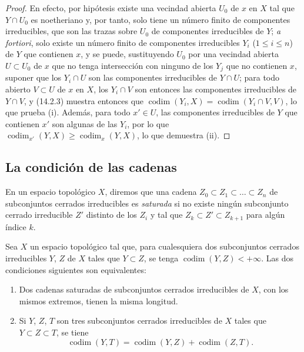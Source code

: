 \begin{proof}
En efecto, por hipótesis existe una vecindad abierta $U_0$ de $x$ en $X$ tal
que $Y\cap U_0$ es noetheriano y, por tanto, solo tiene un número finito de
componentes irreducibles, que son las trazas sobre $U_0$ de componentes
irreducibles de $Y$; \emph{a fortiori}, solo existe un número finito de
componentes irreducibles $Y_i$ ($1\leq i\leq n$) de $Y$ que contienen $x$, y
se puede, sustituyendo $U_0$ por una vecindad abierta $U\subset U_0$ de $x$ que
no tenga intersección con ninguno de los $Y_j$ que no contienen $x$, suponer
que los $Y_i\cap U$ son las componentes irreducibles de $Y\cap U$; para todo
abierto $V\subset U$ de $x$ en $X$, los $Y_i\cap V$ son entonces las
componentes irreducibles de $Y\cap V$, y (14.2.3) muestra entonces que
$\operatorname{codim}(Y_i,X)=\operatorname{codim}(Y_i\cap V,V)$, lo que
prueba (i). Además, para todo $x'\in U$, las componentes irreducibles de $Y$
que contienen $x'$ son algunas de las $Y_i$, por lo que
$\operatorname{codim}_{x'}(Y,X)\geq\operatorname{codim}_x(Y,X)$, lo que
demuestra (ii).
\end{proof}

\subsection{La condición de las cadenas}
\label{subsection:0.14.3-fr}

\begin{env}[14.3.1]
\label{0.14.3.1-fr}
En un espacio topológico $X$, diremos que una cadena
$Z_0\subset Z_1\subset\ldots\subset Z_n$ de subconjuntos cerrados irreducibles es
\emph{saturada} si no existe ningún subconjunto cerrado irreducible $Z'$ distinto
de los $Z_i$ y tal que $Z_k\subset Z'\subset Z_{k+1}$ para algún índice $k$.
\end{env}

\begin{proposition}[14.3.2]
\label{0.14.3.2-fr}
Sea $X$ un espacio topológico tal que, para cualesquiera dos subconjuntos
cerrados irreducibles $Y$, $Z$ de $X$ tales que $Y\subset Z$, se tenga
$\operatorname{codim}(Y,Z)<+\infty$. Las dos condiciones siguientes son
equivalentes:
\begin{enumerate}
  \item[\rm(a)] Dos cadenas saturadas de subconjuntos cerrados irreducibles de $X$,
  con los mismos extremos, tienen la misma longitud.
  \item[\rm(b)] Si $Y$, $Z$, $T$ son tres subconjuntos cerrados irreducibles de
  $X$ tales que $Y\subset Z\subset T$, se tiene
  \[
    \operatorname{codim}(Y,T)=
    \operatorname{codim}(Y,Z)+\operatorname{codim}(Z,T).
    \tag{14.3.2.1}\label{0.14.3.2.1-fr}
  \]
\end{enumerate}
\end{proposition}

